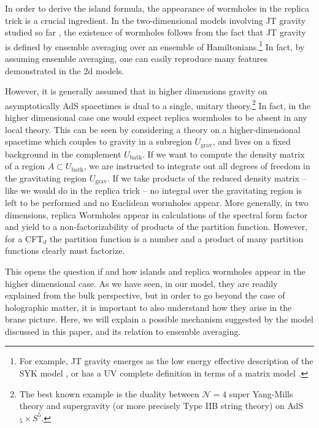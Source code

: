 %




In order to derive the island formula, the appearance of wormholes in the replica trick is a crucial ingredient.
In the two-dimensional models involving JT gravity studied so far \cite{Almheiri:2019qdq,Penington:2019kki}, the existence of wormholes follows from the fact that JT gravity is defined by ensemble averaging over an ensemble of Hamiltonians.\footnote{For example, JT gravity emerges as the low energy effective description of the SYK model \cite{}, or has a UV complete definition in terms of a matrix model \cite{Saad:2019lba}.} In fact, by assuming ensemble averaging, one can easily reproduce many features \cite{Marolf:2020xie} demonstrated in the 2d models. 

However, it is generally assumed that in higher dimensions gravity on asymptotically AdS spacetimes is dual to a single, unitary theory.\footnote{The best known example is the duality between $\mathcal N=4$ super Yang-Mills theory and supergravity (or more precisely Type IIB string theory) on AdS${}_5\times S^5$.} In fact, in the higher dimensional case one would expect replica wormholes to be absent in any local theory. This can be seen by considering a theory on a higher-dimensional spacetime which couples to gravity in a subregion $U_\text{grav}$, and lives on a fixed background in the complement $U_\text{bath}$. If we want to compute the density matrix of a region $A \subset U_\text{bath}$, we are instructed to integrate out all degrees of freedom in the gravitating region $U_\text{grav}$. If we take products of the reduced density matrix -- like we would do in the replica trick -- no integral over the gravitating region is left to be performed and no Euclidean wormholes appear. More generally, in two dimensions, replica Wormholes appear in calculations of the spectral form factor and yield to a non-factorizability of products of the partition function. However, for a CFT${}_d$ the partition function is a number and a product of many partition functions clearly must factorize.

This opens the question if and how islands and replica wormholes appear in the higher dimensional case. As we have seen, in our model, they are readily explained from the bulk perspective, but in order to go beyond the case of holographic matter, it is important to also understand how they arise in the brane picture. Here, we will explain a possible mechanism suggested by the model discussed in this paper, and its relation to ensemble averaging.


